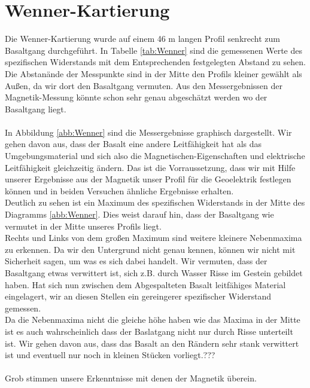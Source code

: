 


\section{Wenner-Kartierung}
Die Wenner-Kartierung wurde auf einem 46 m langen Profil senkrecht zum Basaltgang durchgeführt. In Tabelle \ref{tab:Wenner} sind die gemessenen Werte des spezifischen Widerstands mit dem Entsprechenden festgelegten Abstand zu sehen. Die Abstanände
der Messpunkte sind in der Mitte den Profils kleiner gewählt als Außen, da wir dort den Basaltgang vermuten. Aus den Messergebnissen der Magnetik-Messung könnte schon sehr genau abgeschätzt werden wo der Basaltgang liegt.\\
\\
In Abbildung \ref{abb:Wenner} sind die Messergebnisse graphisch dargestellt. Wir gehen davon aus, dass der Basalt eine andere Leitfähigkeit hat als das Umgebungsmaterial und sich also die Magnetischen-Eigenschaften und elektrische Leitfähigkeit 
gleichzeitig ändern. Das ist die Vorraussetzung, dass wir mit Hilfe unserer Ergebnisse aus der Magnetik unser Profil für die Geoelektrik festlegen können und in beiden Versuchen ähnliche Ergebnisse erhalten.\\
Deutlich zu sehen ist ein Maximum des spezifischen Widerstands in der Mitte des Diagramms \ref{abb:Wenner}.
Dies weist darauf hin, dass der Basaltgang wie vermutet in der Mitte unseres Profils liegt. \\
Rechts und Links von dem großen Maximum sind weitere kleinere Nebenmaxima zu erkennen. Da wir den Untergrund nicht genau kennen, können wir nicht mit Sicherheit sagen, um was es sich dabei handelt. Wir vermuten, dass der Basaltgang etwas verwittert 
ist, sich z.B. durch Wasser Risse im Gestein gebildet haben. Hat sich nun zwischen dem Abgespalteten Basalt leitfähiges Material eingelagert, wir an diesen Stellen ein gereingerer spezifischer Widerstand gemessen.\\
Da die Nebenmaxima nicht die gleiche höhe haben wie das Maxima in der Mitte ist es auch wahrscheinlich dass der Baslatgang nicht nur durch Risse unterteilt ist. Wir gehen davon aus, dass das Basalt an den Rändern sehr stank verwittert ist und eventuell
nur noch in kleinen Stücken vorliegt.???\\
\\
Grob stimmen unsere Erkenntnisse mit denen der Magnetik überein.




